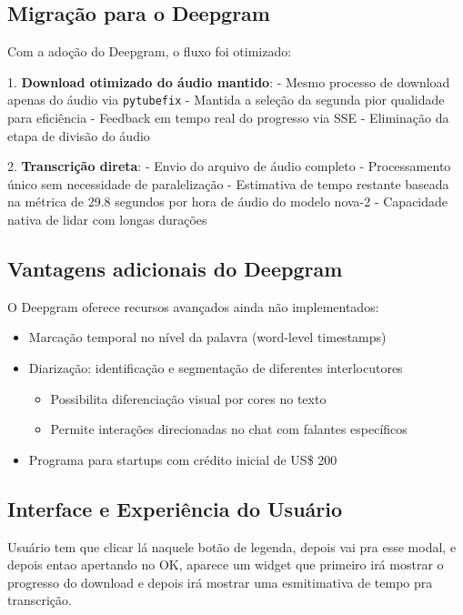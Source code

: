 \documentclass[tcc,capa]{texufpel}
\begin{document}
\subsection{Migração para o Deepgram}

Com a adoção do Deepgram, o fluxo foi otimizado:

1. \textbf{Download otimizado do áudio mantido}:
   - Mesmo processo de download apenas do áudio via \texttt{pytubefix}
   - Mantida a seleção da segunda pior qualidade para eficiência
   - Feedback em tempo real do progresso via SSE
   - Eliminação da etapa de divisão do áudio

2. \textbf{Transcrição direta}:
   - Envio do arquivo de áudio completo
   - Processamento único sem necessidade de paralelização
   - Estimativa de tempo restante baseada na métrica de 29.8 segundos por hora de áudio do modelo nova-2
   - Capacidade nativa de lidar com longas durações

\subsection{Vantagens adicionais do Deepgram}

O Deepgram oferece recursos avançados ainda não implementados:

\begin{itemize}
  \item Marcação temporal no nível da palavra (word-level timestamps)
  \item Diarização: identificação e segmentação de diferentes interlocutores
    \begin{itemize}
    \item Possibilita diferenciação visual por cores no texto
    \item Permite interações direcionadas no chat com falantes específicos
    \end{itemize}
  \item Programa para startups com crédito inicial de US\$ 200
  \end{itemize}

\subsection{Interface e Experiência do Usuário}

Usuário tem que clicar lá naquele botão de legenda, depois vai pra esse modal, e depois entao apertando no OK, aparece um widget que primeiro irá mostrar o progresso do download e depois irá mostrar uma esmitimativa de tempo pra transcrição.
\end{document}

